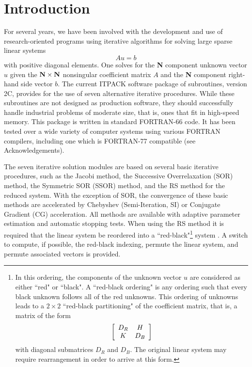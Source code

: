 \section{Introduction}
\label{intro}

For several years, we have been involved with the development and use of
research-oriented programs using iterative algorithms for solving large
sparse linear systems
\[ Au = b \]
with positive diagonal elements. One solves for the {\bf N} component 
unknown vector $u$ given the ${\bf N \times N}$ nonsingular 
coefficient matrix $A$ and the {\bf N} component right-hand side vector 
$b$.  The current ITPACK software package of subroutines, version 2C, 
provides for the use of seven alternative iterative procedures.  While 
these subroutines are not designed as production software, they should 
successfully handle industrial problems of moderate size, that is, ones 
that fit in high-speed memory.  This package is written in standard 
FORTRAN-66 code.  It has been tested over a wide variety of computer 
systems using various FORTRAN compilers, including one which is 
FORTRAN-77 compatible (see Acknowledgements).
 
The seven iterative solution modules are based on several basic
iterative procedures, such as the Jacobi method, the Successive
Overrelaxation (SOR) method, the Symmetric SOR (SSOR) method, and the RS
method for the reduced system.  With the exception of SOR, the
convergence of these basic methods are accelerated by Chebyshev
(Semi-Iteration, SI) or Conjugate Gradient (CG) acceleration.  All
methods are available with adaptive parameter estimation and automatic
stopping tests.  When using the RS method it is required that the linear
system be reordered into a ``red-black"\footnote{In this ordering,
the components of the unknown vector $u$ are considered as either 
``red" or ``black".  A ``red-black ordering" is any ordering such 
that every black unknown follows all of the red unknowns.  This ordering 
of unknowns leads to a $2\times 2$ ``red-black partitioning" of the
coefficient matrix, that is, a matrix of the form 
\[ \left[ \begin{array}{cc}
    D_R & H   \\ 
    K   & D_B  \end{array} \right] \]
with diagonal submatrices $D_R$ and $D_B$.  The original linear 
system may require rearrangement in order to arrive at this form.}
system \cite{6,12}.  A switch to compute, if possible, the red-black 
indexing, permute the linear system, and permute associated vectors is 
provided.
 
